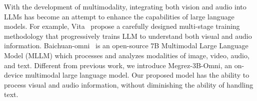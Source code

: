 With the development of multimodality, integrating both vision and audio into LLMs has become an attempt to enhance the capabilities of large language models. For example, Vita~\cite{fu2024vita} propose a carefully designed multi-stage training methodology that progressively trains LLM to understand both visual and audio information. Baichuan-omni~\cite{li2024baichuanomni} is an open-source 7B Multimodal Large Language Model (MLLM) which processes and analyzes modalities of image, video, audio, and text. Different from previous work, we introduce Megrez-3B-Omni, an on-device multimodal large language model. Our proposed model has the ability to process visual and audio information, without diminishing the ability of handling text.